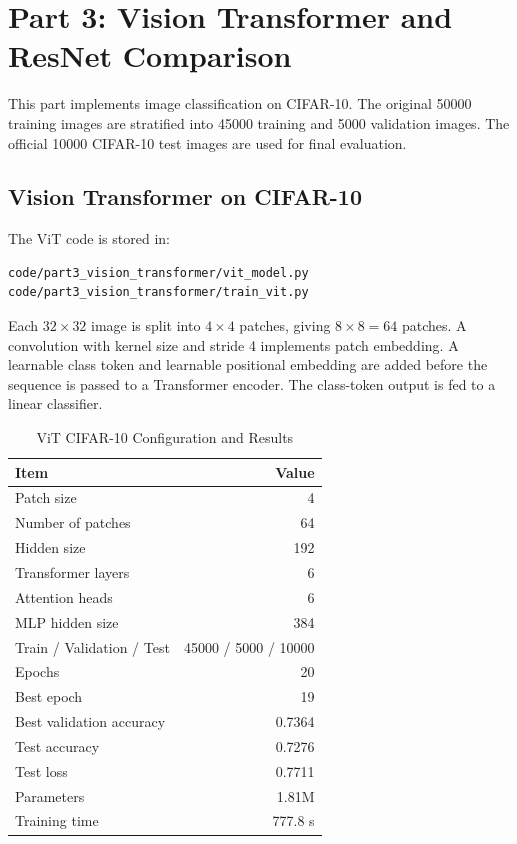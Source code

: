 \documentclass[a4paper,12pt]{article}
\begin{document}
\section{Part 3: Vision Transformer and ResNet Comparison}

This part implements image classification on CIFAR-10. The original 50000 training images are stratified into 45000 training and 5000 validation images. The official 10000 CIFAR-10 test images are used for final evaluation.

\subsection{Vision Transformer on CIFAR-10}

The ViT code is stored in:
\begin{lstlisting}
code/part3_vision_transformer/vit_model.py
code/part3_vision_transformer/train_vit.py
\end{lstlisting}

Each $32\times32$ image is split into $4\times4$ patches, giving $8\times8=64$ patches. A convolution with kernel size and stride 4 implements patch embedding. A learnable class token and learnable positional embedding are added before the sequence is passed to a Transformer encoder. The class-token output is fed to a linear classifier.

\begin{table}[H]
\centering
\caption{ViT CIFAR-10 Configuration and Results}
\label{tab:vit-config-result-en}
\begin{tabular}{lr}
\toprule
Item & Value \\
\midrule
Patch size & 4 \\
Number of patches & 64 \\
Hidden size & 192 \\
Transformer layers & 6 \\
Attention heads & 6 \\
MLP hidden size & 384 \\
Train / Validation / Test & 45000 / 5000 / 10000 \\
Epochs & 20 \\
Best epoch & 19 \\
Best validation accuracy & 0.7364 \\
Test accuracy & 0.7276 \\
Test loss & 0.7711 \\
Parameters & 1.81M \\
Training time & 777.8 s \\
\bottomrule
\end{tabular}
\end{table}
\end{document}

